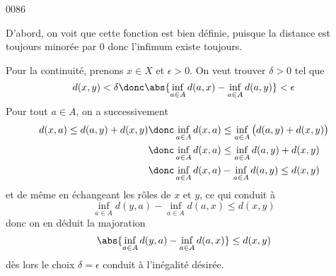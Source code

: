 
\begin{corrige}{0086}

D'abord, on voit que cette fonction est bien définie, puisque la
distance est toujours minorée par $0$ donc l'infimum existe toujours.

Pour la continuité, prenons $x \in X$ et $\epsilon > 0$. On veut trouver $\delta>0$ tel que
\[d(x,y) < \delta \donc \abs{\inf_{a \in A} d(a,x) - \inf_{a\in A} d(a,y)} < \epsilon\]
Pour tout
$a\in A$, on a successivement
\begin{align*}
d(x,a) \leq d(a,y) + d(x,y) \donc& \inf_{a\in A} d(x,a) \leq \inf_{a\in A} \big(d(a,y) + d(x,y)\big)\\
\donc& \inf_{a \in A} d(x,a) \leq \inf_{a\in A} d(a,y) + d(x,y)\\
\donc& \inf_{a \in A} d(x,a) - \inf_{a\in A} d(a,y) \leq d(x,y)
\end{align*}
et de même en échangeant les rôles de $x$ et $y$, ce qui conduit à
\[\inf_{a \in A} d(y,a) - \inf_{a\in A} d(a,x) \leq d(x,y)\]
donc on en déduit la majoration
\begin{equation}		\label{eq:ex13}
	\abs{\inf_{a \in A} d(y,a) - \inf_{a\in A} d(a,x)} \leq d(x,y)
\end{equation}
dès lors le choix $\delta = \epsilon$ conduit à l'inégalité désirée.

\end{corrige}
